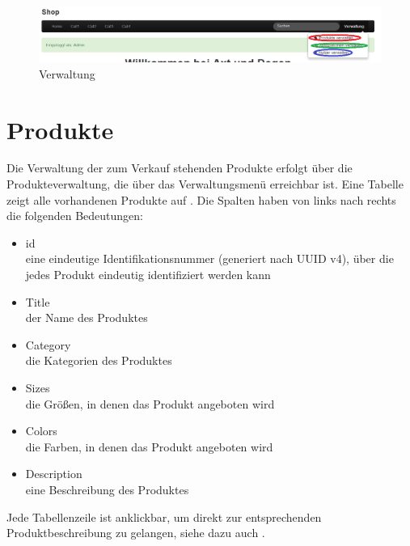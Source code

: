 \begin{figure}[h!]
  \centering
  \includegraphics[width=\textwidth]{img/Verwaltung.png}
  \caption{Verwaltung}
  \label{fig:Verwaltung}
\end{figure}


\section{Produkte}
\label{chp:Produkte}
Die Verwaltung der zum Verkauf stehenden Produkte erfolgt über die Produkteverwaltung, die über das Verwaltungsmenü erreichbar ist. Eine Tabelle zeigt alle vorhandenen Produkte auf . Die Spalten haben von links nach rechts die folgenden Bedeutungen:
\begin{itemize}
  \item id \\
        eine eindeutige Identifikationsnummer (generiert nach UUID v4), über die jedes Produkt eindeutig identifiziert werden kann
  \vspace*{-0.5em}
  \item Title \\
        der Name des Produktes
  \vspace*{-0.5em}
  \item Category \\
        die Kategorien des Produktes
  \vspace*{-0.5em}
  \item Sizes \\
        die Größen, in denen das Produkt angeboten wird
  \vspace*{-0.5em}
  \item Colors \\
        die Farben, in denen das Produkt angeboten wird
  \vspace*{-0.5em}
  \item Description \\
        eine Beschreibung des Produktes
\end{itemize}
Jede Tabellenzeile ist anklickbar, um direkt zur entsprechenden Produktbeschreibung zu gelangen, siehe dazu auch .

